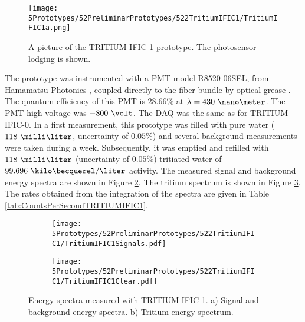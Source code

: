 \begin{figure}[h]
\centering
\texttt{[image: 5Prototypes/52PreliminarPrototypes/522TritiumIFIC1/TritiumIFIC1a.png]}
\caption{A picture of the TRITIUM-IFIC-1 prototype. The photosensor lodging is shown.\label{fig:TritumIFIC1}}
\end{figure}
The prototype was instrumented with a PMT model R8520-06SEL, from Hamamatsu Photonics \cite{DataSheetPMTs}, coupled directly to the fiber bundle by optical grease \cite{OpticalGrease}. The quantum efficiency of this PMT is $28.66\%$ at $\lambda=430~\nano\meter$.  The PMT high voltage was $-800~\volt$. The DAQ was the same as for TRITIUM-IFIC-0. In a first measurement, this prototype was filled with pure water ($118~\milli\liter$, uncertainty of $0.05\%$) and several background measurements were taken during a week. Subsequently, it was emptied and refilled with $118~\milli\liter$ (uncertainty of $0.05\%$) tritiated water of $99.696~\kilo\becquerel/\liter$ activity. The measured signal and background energy spectra are shown in Figure \ref{subfig:SignalBackgroundEnergySpectraTritiumIFIC1}. The tritium spectrum is shown in Figure \ref{subfig:TritiumEnergySpectraTritiumIFIC1}. The rates obtained from the integration of the spectra are given in Table \ref{tab:CountsPerSecondTRITIUMIFIC1}. 

\begin{figure}
\centering
    \begin{subfigure}[b]{1\textwidth}
    \centering
    \texttt{[image: 5Prototypes/52PreliminarPrototypes/522TritiumIFIC1/TritiumIFIC1Signals.pdf]}  
    \caption{\label{subfig:SignalBackgroundEnergySpectraTritiumIFIC1}}
    \end{subfigure}
    \hfill
    \begin{subfigure}[b]{1\textwidth}
    \centering
    \texttt{[image: 5Prototypes/52PreliminarPrototypes/522TritiumIFIC1/TritiumIFIC1Clear.pdf]}  
    \caption{\label{subfig:TritiumEnergySpectraTritiumIFIC1}}
    \end{subfigure}
 \caption{Energy spectra measured with TRITIUM-IFIC-1. a) Signal and background energy spectra. b) Tritium energy spectrum.}
 \label{fig:EnergySpectraTRITIUMIFIC1}
\end{figure}

